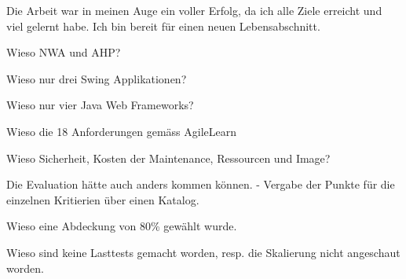   Die Arbeit war in meinen Auge ein voller Erfolg, da ich alle Ziele erreicht
  und viel gelernt habe. Ich bin bereit für einen neuen Lebensabschnitt.

  Wieso NWA und AHP?

  Wieso nur drei Swing Applikationen?
  
  Wieso nur vier Java Web Frameworks?
  
  Wieso die 18 Anforderungen gemäss AgileLearn
  
  Wieso Sicherheit, Kosten der Maintenance, Ressourcen und Image?
  
  Die Evaluation hätte auch anders kommen können.
    - Vergabe der Punkte für die einzelnen Kritierien über einen Katalog.
    
  Wieso eine Abdeckung von 80\% gewählt wurde.
  
  Wieso sind keine Lasttests gemacht worden, resp. die Skalierung nicht
  angeschaut worden.
